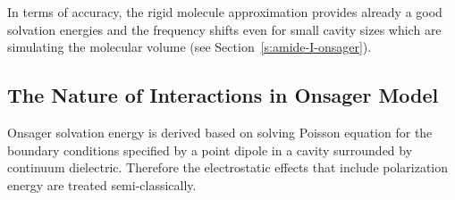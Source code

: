 \documentclass[a4paper,titlepage,twoside,fleqn,12pt]{book}
\begin{document}
\begin{refsection}
In terms of accuracy, the rigid molecule approximation
provides already a good solvation energies and the frequency shifts
even for small cavity sizes which are simulating the molecular
volume
(see Section~\ref{s:amide-I-onsager}). 

\subsection{The Nature of Interactions in Onsager Model}

Onsager solvation energy is derived based on solving Poisson
equation for the boundary conditions specified by a point
dipole in a cavity surrounded by continuum dielectric.
Therefore the electrostatic effects that include polarization
energy are treated semi\hyp{}classically.


\end{refsection}
\end{document}
